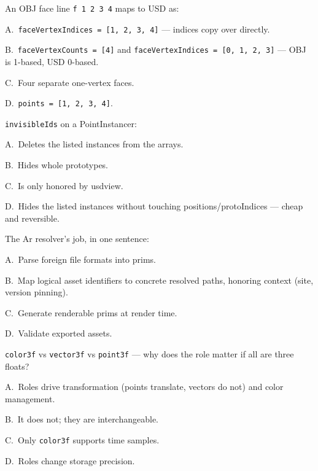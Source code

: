 An OBJ face line \texttt{f 1 2 3 4} maps to USD as:
\begin{Choices}
  \item A.\ \texttt{faceVertexIndices = [1, 2, 3, 4]} --- indices copy over directly.
  \item B.\ \texttt{faceVertexCounts = [4]} and
        \texttt{faceVertexIndices = [0, 1, 2, 3]} --- OBJ is 1-based, USD
        0-based.
  \item C.\ Four separate one-vertex faces.
  \item D.\ \texttt{points = [1, 2, 3, 4]}.
\end{Choices}

\texttt{invisibleIds} on a PointInstancer:
\begin{Choices}
  \item A.\ Deletes the listed instances from the arrays.
  \item B.\ Hides whole prototypes.
  \item C.\ Is only honored by usdview.
  \item D.\ Hides the listed instances without touching positions/protoIndices --- cheap and reversible.
\end{Choices}

The Ar resolver's job, in one sentence:
\begin{Choices}
  \item A.\ Parse foreign file formats into prims.
  \item B.\ Map logical asset identifiers to concrete resolved paths, honoring context (site, version pinning).
  \item C.\ Generate renderable prims at render time.
  \item D.\ Validate exported assets.
\end{Choices}

\texttt{color3f} vs \texttt{vector3f} vs \texttt{point3f} --- why does the
role matter if all are three floats?
\begin{Choices}
  \item A.\ Roles drive transformation (points translate, vectors do not) and color management.
  \item B.\ It does not; they are interchangeable.
  \item C.\ Only \texttt{color3f} supports time samples.
  \item D.\ Roles change storage precision.
\end{Choices}

